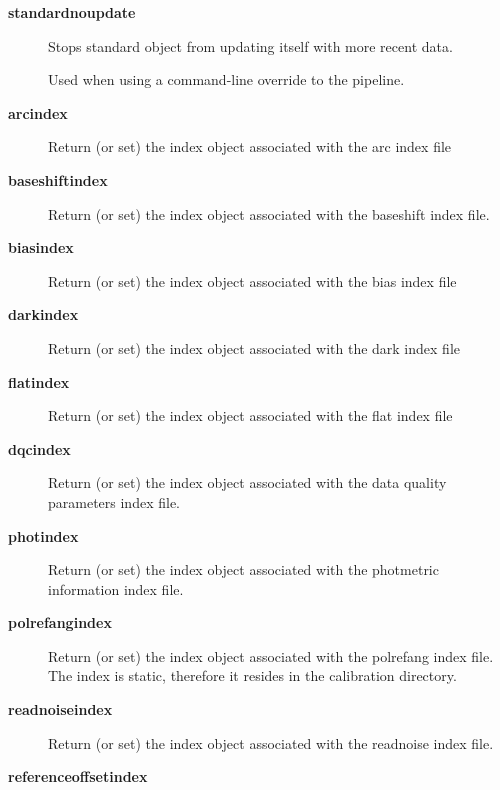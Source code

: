 \begin{description}
\item[\textbf{standardnoupdate}] \mbox{}

Stops standard object from updating itself with more recent data.



Used when using a command-line override to the pipeline.


\item[\textbf{arcindex}] \mbox{}

Return (or set) the index object associated with the arc index file


\item[\textbf{baseshiftindex}] \mbox{}

Return (or set) the index object associated with the baseshift index file.


\item[\textbf{biasindex}] \mbox{}

Return (or set) the index object associated with the bias index file


\item[\textbf{darkindex}] \mbox{}

Return (or set) the index object associated with the dark index file


\item[\textbf{flatindex}] \mbox{}

Return (or set) the index object associated with the flat index file


\item[\textbf{dqcindex}] \mbox{}

Return (or set) the index object associated with the data quality
parameters index file.


\item[\textbf{photindex}] \mbox{}

Return (or set) the index object associated with the photmetric
information index file.


\item[\textbf{polrefangindex}] \mbox{}

Return (or set) the index object associated with the polrefang index file.
The index is static, therefore it resides in the calibration directory.


\item[\textbf{readnoiseindex}] \mbox{}

Return (or set) the index object associated with the readnoise index file.


\item[\textbf{referenceoffsetindex}] \mbox{}


\end{description}
